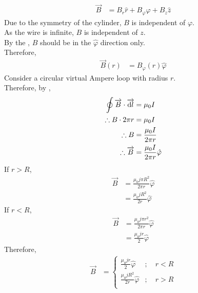 \documentclass[fleqn, a4paper, 12pt, twoside]{article}
\theoremstyle{definition}
\theoremstyle{theorem}
\begin{document}
\begin{solution}
	\begin{align*}
		\overrightarrow{B} & = B_r \hat{r} + B_{\varphi} \hat{\varphi} + B_z \hat{z}
	\end{align*}
	Due to the symmetry of the cylinder, $B$ is independent of $\varphi$.\\
	As the wire is infinite, $B$ is independent of $z$.\\
	By the , $B$ should be in the $\hat{\varphi}$ direction only.\\
	Therefore,
	\begin{align*}
		\overrightarrow{B}(r) & = B_{\varphi}(r) \hat{\varphi}
	\end{align*}
	Consider a circular virtual Ampere loop with radius $r$.\\
	Therefore, by ,
	\begin{align*}
		\oint \overrightarrow{B} \cdot \overrightarrow{\dif l} & = \mu_0 I                 \\
		\therefore B \cdot 2 \pi r                             & = \mu_0 I                 \\
		\therefore B                                           & = \frac{\mu_0 I}{2 \pi r} \\
		\therefore \overrightarrow{B}                          & = \frac{\mu_0 I}{2 \pi r} \hat{\varphi}
	\end{align*}
	If $r > R$,
	\begin{align*}
		\overrightarrow{B} & = \frac{\mu_0 j \pi R^2}{2 \pi r} \hat{\varphi} \\
                                   & = \frac{\mu_0 j R^2}{2 r} \hat{\varphi}
	\end{align*}
	If $r < R$,
	\begin{align*}
		\overrightarrow{B} & = \frac{\mu_0 j \pi r^2}{2 \pi r} \hat{\varphi} \\
                                   & = \frac{\mu_0 j r}{2} \hat{\varphi}
	\end{align*}
	Therefore,
	\begin{align*}
		\overrightarrow{B} &=
			\begin{cases}
				\frac{\mu_0 j r}{2} \hat{\varphi}     & ;\quad r < R \\
				\frac{\mu_0 j R^2}{2 r} \hat{\varphi} & ;\quad r > R \\
			\end{cases}
	\end{align*}
\end{solution}
\end{document}
